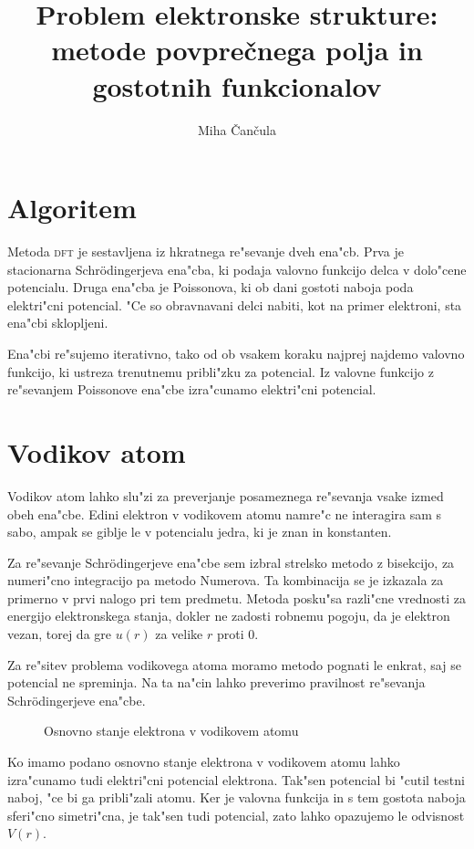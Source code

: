 \documentclass[a4paper,10pt]{article}
\title{Problem elektronske strukture: metode povprečnega polja in gostotnih funkcionalov}
\author{Miha \v Can\v cula}
\begin{document}
\maketitle

\section{Algoritem}

Metoda \textsc{dft} je sestavljena iz hkratnega re"sevanje dveh ena"cb. 
Prva je stacionarna Schr\"odingerjeva ena"cba, ki podaja valovno funkcijo delca v dolo"cene potencialu. 
Druga ena"cba je Poissonova, ki ob dani gostoti naboja poda elektri"cni potencial.
"Ce so obravnavani delci nabiti, kot na primer elektroni, sta ena"cbi sklopljeni. 

Ena"cbi re"sujemo iterativno, tako od ob vsakem koraku najprej najdemo valovno funkcijo, ki ustreza trenutnemu pribli"zku za potencial. 
Iz valovne funkcijo z re"sevanjem Poissonove ena"cbe izra"cunamo elektri"cni potencial. 

\section{Vodikov atom}

Vodikov atom lahko slu"zi za preverjanje posameznega re"sevanja vsake izmed obeh ena"cbe. 
Edini elektron v vodikovem atomu namre"c ne interagira sam s sabo, ampak se giblje le v potencialu jedra, ki je znan in konstanten. 

Za re"sevanje Schr\"odingerjeve ena"cbe sem izbral strelsko metodo z bisekcijo, za numeri"cno integracijo pa metodo Numerova. 
Ta kombinacija se je izkazala za primerno v prvi nalogo pri tem predmetu. 
Metoda posku"sa razli"cne vrednosti za energijo elektronskega stanja, dokler ne zadosti robnemu pogoju, da je elektron vezan, torej da gre $u(r)$ za velike $r$ proti 0. 

Za re"sitev problema vodikovega atoma moramo metodo pognati le enkrat, saj se potencial ne spreminja. 
Na ta na"cin lahko preverimo pravilnost re"sevanja Schr\"odingerjeve ena"cbe. 

\begin{figure}[H]
 \caption{Osnovno stanje elektrona v vodikovem atomu}
 \label{fig:vodik-sch}
\end{figure}

Ko imamo podano osnovno stanje elektrona v vodikovem atomu lahko izra"cunamo tudi elektri"cni potencial elektrona. 
Tak"sen potencial bi "cutil testni naboj, "ce bi ga pribli"zali atomu. 
Ker je valovna funkcija in s tem gostota naboja sferi"cno simetri"cna, je tak"sen tudi potencial, zato lahko opazujemo le odvisnost $V(r)$. 
\end{document}
